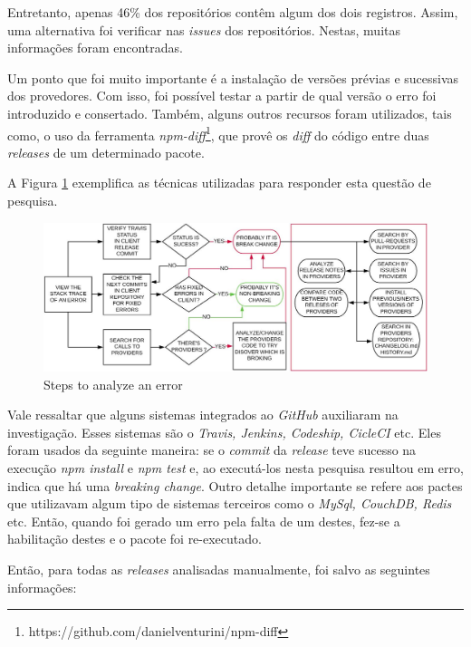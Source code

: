 Entretanto, apenas 46\% dos repositórios contêm algum dos dois registros. Assim, uma alternativa foi verificar nas \textit{issues} dos repositórios. Nestas, muitas informações foram encontradas.

Um ponto que foi muito importante é a instalação de versões prévias e sucessivas dos provedores. Com isso, foi possível testar a partir de qual versão o erro foi introduzido e consertado. Também, alguns outros recursos foram utilizados, tais como, o uso da ferramenta \textit{npm-diff}\footnote{https://github.com/danielventurini/npm-diff}, que provê os \textit{diff} do código entre duas \textit{releases} de um determinado pacote.

A Figura \ref{fig:step_analyze} exemplifica as técnicas utilizadas para responder esta questão de pesquisa.

\begin{figure}
    \centering
    \includegraphics[scale=0.35]{figuras/step_analyze.jpeg}
    \caption{Steps to analyze an error}
    \label{fig:step_analyze}
\end{figure}

Vale ressaltar que alguns sistemas integrados ao \textit{GitHub} auxiliaram na investigação. Esses sistemas são o \textit{Travis, Jenkins, Codeship, CicleCI} etc. Eles foram usados da seguinte maneira: se o \textit{commit} da \textit{release} teve sucesso na execução \textit{npm install} e \textit{npm test} e, ao executá-los nesta pesquisa resultou em erro, indica que há uma \textit{breaking change}. Outro detalhe importante se refere aos pactes que utilizavam algum tipo de sistemas terceiros como o \textit{MySql, CouchDB, Redis} etc. Então, quando foi gerado um erro pela falta de um destes, fez-se a habilitação destes e o pacote foi re-executado.

Então, para todas as \textit{releases} analisadas manualmente, foi salvo as seguintes informações:

